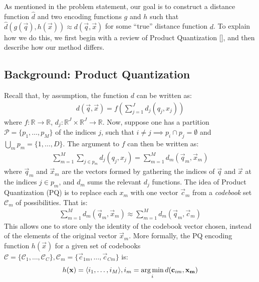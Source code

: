 
As mentioned in the problem statement, our goal is to construct a distance function $\hat{d}$ and two encoding functions $g$ and $h$ such that $\hat{d}(g(\vec{q}), h(\vec{x})) \approx d(\vec{q}, \vec{x})$ for some ``true'' distance function $d$. To explain how we do this, we first begin with a review of Product Quantization [], and then describe how our method differs.

\subsection{Background: Product Quantization}

Recall that, by assumption, the function $d$ can be written as:
\begin{align*}
        d(\vec{q}, \vec{x}) = f(\sum_{j=1}^J d_j(q_j, x_j))
\end{align*}
where $f: \mathbb{R} \rightarrow \mathbb{R}$, $d_j: \mathbb{R}^J \times \mathbb{R}^J \rightarrow \mathbb{R}$. Now, suppose one has a partition $\mathcal{P} = \{p_1,\ldots,p_M \}$ of the indices $j$, such that $i \ne j \implies p_i \cap p_j = \emptyset$ and $\bigcup_m p_m = \{1,\ldots,D\}$. The argument to $f$ can then be written as:
\begin{align}
        \sum_{m=1}^M \sum_{j \in p_m} d_j(q_j, x_j)
            = \sum_{m=1}^M d_m(\vec{q}_m, \vec{x}_m)
\end{align}
where $\vec{q}_m$ and $\vec{x}_m$ are the vectors formed by gathering the indices of $\vec{q}$ and $\vec{x}$ at the indices $j \in p_m$, and $d_m$ sums the relevant $d_j$ functions. The idea of Product Quantization (PQ) is to replace each $x_m$ with one vector $\vec{c}_{m}$ from a \textit{codebook} set $\mathcal{C}_m$ of possibilities. That is: %
\begin{align} \label{eq:pqDistNoLut}
        \sum_{m=1}^M d_m(\vec{q}_m, \vec{x}_m) \approx \sum_{m=1}^M d_m(\vec{q}_m, \vec{c}_{m})
\end{align}
This allows one to store only the identity of the codebook vector chosen, instead of the elements of the original vector $\vec{x}_m$. More formally, the PQ encoding function $h(\vec{x})$ for a given set of codebooks $\mathcal{C} = \{\mathcal{C}_1,\ldots,\mathcal{C}_C\}, \mathcal{C}_m = \{\vec{c}_{1m},\ldots,\vec{c}_{Cm}\}$ is:
\begin{align}
    h(\mathbf{x}) = \langle i_1,\ldots,i_M \rangle,  i_m = \operatorname*{arg\,min}_i d(\mathbf{c}_{im}, \mathbf{x_m})
\end{align}

